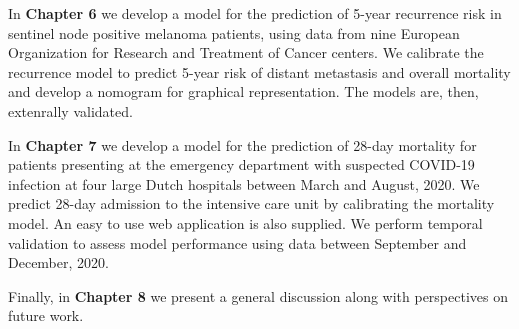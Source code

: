 \documentclass[
]{book}
\begin{document}
In \textbf{Chapter 6} we develop a model for the prediction of 5-year recurrence risk
in sentinel node positive melanoma patients, using data from nine European
Organization for Research and Treatment of Cancer centers. We calibrate the
recurrence model to predict 5-year risk of distant metastasis and overall
mortality and develop a nomogram for graphical representation. The models are,
then, extenrally validated.

In \textbf{Chapter 7} we develop a model for the prediction of 28-day mortality for
patients presenting at the emergency department with suspected COVID-19
infection at four large Dutch hospitals between March and August, 2020. We
predict 28-day admission to the intensive care unit by calibrating the mortality
model. An easy to use web application is also supplied. We perform temporal
validation to assess model performance using data between September and
December, 2020.

Finally, in \textbf{Chapter 8} we present a general discussion along with perspectives on
future work.
\end{document}
